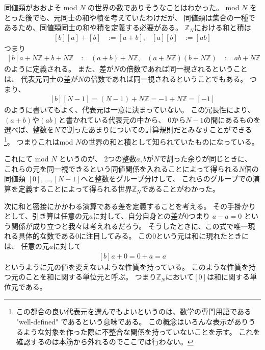 \documentclass[../master.tex]{subfiles}
\begin{document}
同値類がおおよそ mod $N$ の世界の数でありそうなことはわかった。
mod $N$ をとった後でも、元同士の和や積を考えていたわけだが、
同値類は集合の一種であるため、同値類同士の和や積を定義する必要がある。
$\mathbb{Z}_N$における和と積は
\begin{equation}\begin{aligned}[b]
    [a]+[b] &:=[a+b], &
    [a][b] &:=[ab]
\end{aligned}\end{equation}
つまり
\begin{equation}\begin{aligned}[b]
    a+N\mathbb{Z} + b+N\mathbb{Z} &:= (a+b)+N\mathbb{Z}, &
    (a+N\mathbb{Z})(b+N\mathbb{Z}) &:= ab + N\mathbb{Z}
\end{aligned}\end{equation}
のように定義される。
また、差が$N$の倍数であれば同一視されるということは、
代表元同士の差が$N$の倍数であれば同一視されるということでもある。
つまり、
\begin{equation}\begin{aligned}[b]
    [N-1] = (N-1)+ N\mathbb{Z} = -1 +N\mathbb{Z} = [-1]
\end{aligned}\end{equation}
のように書いてもよく、代表元は一意に決まっていない。
この冗長性により、$(a+b)$や$(ab)$と書かれている代表元の中から、
0から$N-1$の間にあるものを選べば、整数を$N$で割ったあまりについての計算規則だとみなすことができる
\footnote{この都合の良い代表元を選んでもよいというのは、数学の専門用語である "well-defined" であるという意味である。
この概念はいろんな表示がありうるような対象を作った際に不整合な関係を持っていないことを示す。
これを確認するのは本筋から外れるのでここでは行わない。}。
つまりこれはmod $N$の世界の和と積として知られていたものになっている。

これにて mod $N$ というのが、
2つの整数$a,b$が$N$で割った余りが同じときに、
これらの元を同一視できるという同値関係を入れることによって得られる$N$個の同値類
$[0],\ldots,[N-1]$へと整数をグループ分けして、
これらのグループでの演算を定義することによって得られる世界$\mathbb{Z}_N$であることがわかった。

次に和と密接にかかわる演算である差を定義することを考える。
その手掛かりとして、引き算は任意の元$a$に対して、自分自身との差が0つまり
$a-a=0$
という関係が成り立つと我々は考えれるだろう。
そうしたときに、この式で唯一現れる具体的な数である$0$に注目してみる。
この$0$という元は和に現れたときには、
任意の元$a$に対して
\begin{equation}\begin{aligned}[b]
    a+0 = 0+a = a
\end{aligned}\end{equation}
というように元の値を変えないような性質を持っている。
このような性質を持つ元のことを和に関する単位元と呼ぶ。
つまり$\mathbb{Z}_N$において$[0]$は和に関する単位元である。
\end{document}
